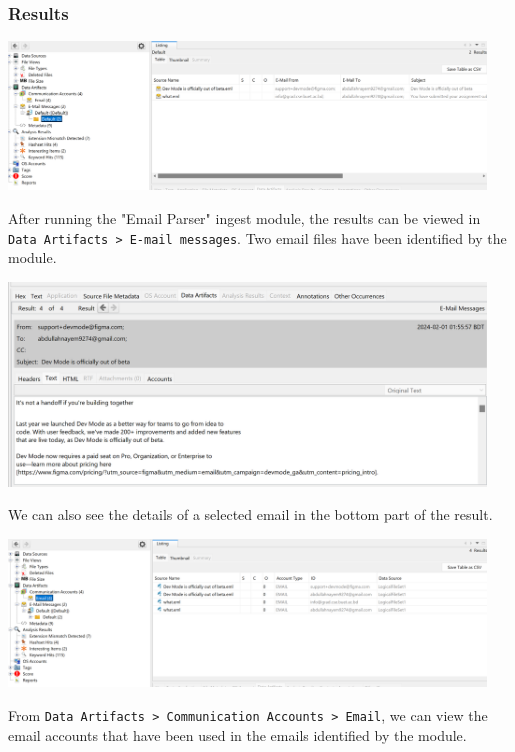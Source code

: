 \documentclass{article}
\begin{document}
\subsubsection*{Results}

\begin{center}
    \includegraphics[width=0.95\textwidth]{3/3.9/Results of Email Parser ingest module.png}
\end{center}

After running the "Email Parser" ingest module, the results can be viewed in \texttt{Data Artifacts > E-mail messages}. Two email files have been identified by the module.

\begin{center}
    \includegraphics[width=0.95\textwidth]{3/3.9/Details of an email text version.png}
\end{center}

We can also see the details of a selected email in the bottom part of the result.
\begin{center}
    \includegraphics[width=0.95\textwidth]{3/3.9/Email Accounts.png}
\end{center}
From \texttt{Data Artifacts > Communication Accounts > Email}, we can view the email accounts that have been used in the emails identified by the module.
\end{document}
